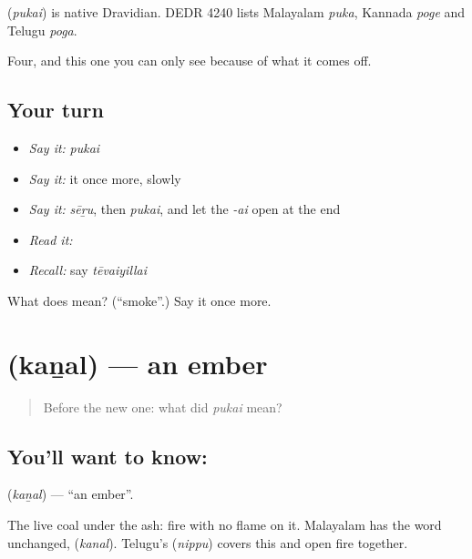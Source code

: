 \begin{cousinweb}
\textbf{} (\emph{pukai}) is native Dravidian. DEDR 4240 lists Malayalam \emph{puka}, Kannada \emph{poge} and Telugu \emph{poga}.
\end{cousinweb}

\begin{grammarlens}[title={What you've built}]
Four, and this one you can only see because of what it comes off.
\end{grammarlens}

\subsection*{Your turn}
\begin{itemize}
\raggedright
  \item \emph{Say it:} \emph{pukai}
  \item \emph{Say it:} it once more, slowly
  \item \emph{Say it:} \emph{sēṟu}, then \emph{pukai}, and let the \emph{-ai} open at the end
  \item \emph{Read it:} \textbf{}
  \item \emph{Recall:} say \emph{tēvaiyillai}
\end{itemize}

\begin{tcolorbox}[breakable,colback=teal!4,colframe=teal!35!black,title={Before you move on}]
What does  mean? (\textquotedblleft{}smoke\textquotedblright{}.) Say it once more.
\end{tcolorbox}
\section[\texorpdfstring{\ta{கனல்} (kaṉal)}{கனல் (kaṉal)}]{ (kaṉal) — an ember}

\label{lesson:TA-C57-ember}



\begin{quote}
Before the new one: what did \emph{pukai} mean?
\end{quote}

\subsection*{You'll want to know: }
\textbf{} (\emph{kaṉal}) — \textquotedblleft{}an ember\textquotedblright{}.

The live coal under the ash: fire with no flame on it. Malayalam has the word unchanged,  (\emph{kanal}). Telugu's  (\emph{nippu}) covers this and open fire together.

